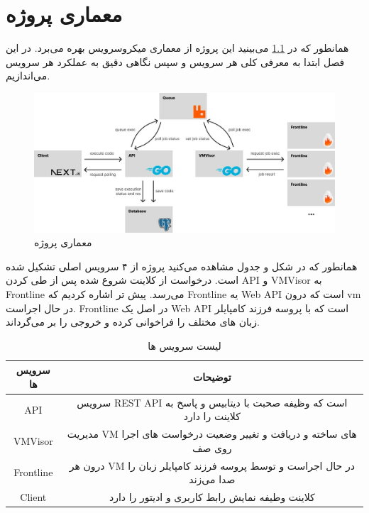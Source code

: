 \chapter{معماری پروژه}

همانطور که در {\ref{fig:architecture}} می‌بینید این پروژه از معماری میکروسرویس بهره می‌برد.
در این فصل ابتدا به معرفی کلی هر سرویس و سپس نگاهی دقیق به عملکرد هر سرویس می‌اندازیم.

\begin{figure}[htbp]
    \centering
    \includegraphics[width=1\textwidth]{./3-Design/design.jpg}
    \caption{معماری پروژه}
    \label{fig:architecture}
\end{figure}

\newpage

همانطور که در شکل و جدول مشاهده می‌کنید پروژه از ۴ سرویس اصلی تشکیل شده است.
درخواست از کلاینت شروع شده پس از طی کردن API و VMVisor به Frontline می‌رسد.
پیش تر اشاره کردیم که Frontline یه Web API است که درون vm در حال اجراست.
Frontline در اصل یک Web API است که با پروسه فرزند کامپایلر زبان های مختلف را فراخوانی کرده و خروجی را بر می‌گرداند.


\begin{table}[hb]
    \centering
    \caption{لیست سرویس ها}
    \label{table:services}
    \begin{tabular}{|c|c|}
        \hline
        سرویس ها  & توضیحات                                                                \\
        \hline

        API       & سرویس REST API است که وظیفه صحبت با دیتابیس و پاسخ به کلاینت را دارد   \\
        \hline

        VMVisor   & مدیریت VM های ساخته و دریافت و تغییر وضعیت درخواست های اجرا روی صف     \\
        \hline

        Frontline & درون هر VM در حال اجراست و توسط پروسه فرزند کامپایلر زبان را صدا می‌زند \\
        \hline


        Client    & کلاینت وطیفه نمایش رابط کاربری و ادیتور را دارد                        \\
        \hline
    \end{tabular}
\end{table}


